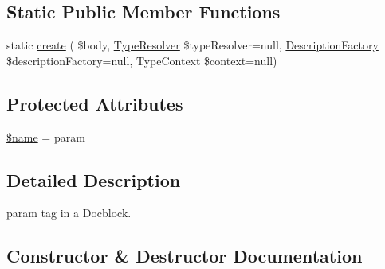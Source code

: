 \subsection*{Static Public Member Functions}
\begin{DoxyCompactItemize}
\item 
static \mbox{\hyperlink{classphp_documentor_1_1_reflection_1_1_doc_block_1_1_tags_1_1_param_a01b1e5c3741d05766720d8cb6d900172}{create}} ( \$body, \mbox{\hyperlink{classphp_documentor_1_1_reflection_1_1_type_resolver}{Type\+Resolver}} \$type\+Resolver=null, \mbox{\hyperlink{classphp_documentor_1_1_reflection_1_1_doc_block_1_1_description_factory}{Description\+Factory}} \$description\+Factory=null, Type\+Context \$context=null)
\end{DoxyCompactItemize}
\subsection*{Protected Attributes}
\begin{DoxyCompactItemize}
\item 
\mbox{\hyperlink{classphp_documentor_1_1_reflection_1_1_doc_block_1_1_tags_1_1_param_ab2fc40d43824ea3e1ce5d86dee0d763b}{\$name}} = \textquotesingle{}param\textquotesingle{}
\end{DoxyCompactItemize}


\subsection{Detailed Description}
param tag in a Docblock. 

\subsection{Constructor \& Destructor Documentation}
\mbox{\label{classphp_documentor_1_1_reflection_1_1_doc_block_1_1_tags_1_1_param_af0e3a703b2a3c77d234572424e79b641}} 
